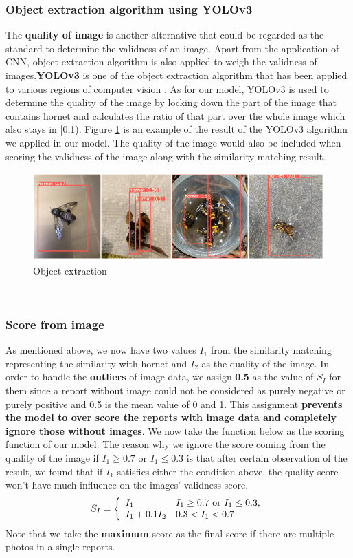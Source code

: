 \documentclass{mcmthesis}
\begin{document}
		\subsubsection{Object extraction algorithm using YOLOv3}
		\quad The \textbf{quality of image} is another alternative that could be regarded as the standard to determine the validness of an image. Apart from the application of CNN, object extraction algorithm is also applied to weigh the validness of images.\textbf{YOLOv3} is one of the object extraction algorithm that has been applied to various regions of computer vision  \cite{Yolo}. As for our model, YOLOv3 is used to determine the quality of the image by locking down the part of the image that contains hornet and calculates the ratio of that part over the whole image which also stays in [0,1). Figure \ref{yolo} is an example of the result of the YOLOv3 algorithm we applied in our model. The quality of the image would also be included when scoring the validness of the image along with the similarity matching result.
			\begin{figure}[h]
			\centering
			\includegraphics[scale=0.38]{yolo.png}
			\caption{Object extraction}
			\label{yolo}
		\end{figure}\\
		\subsubsection{Score from image}
		\quad As mentioned above, we now have two values $I_1$ from the similarity matching representing the similarity with hornet and $I_2$ as the quality of the image. In order to handle the \textbf{outliers} of image data, we assign \textbf{0.5} as the value of $S_I$ for them since a report without image could not be considered as purely negative or purely positive and 0.5 is the mean value of 0 and 1. This assignment \textbf{prevents the model to over score the reports with image data and completely ignore those without images}. We now take the function below as the scoring function of our model. The reason why we ignore the score coming from the quality of the image if $I_1\geq0.7$ or  $I_1\leq0.3$ is that after certain observation of the result, we found that if $I_1$ satisfies either the condition above, the quality score won't have much influence on the images' validness score.
	   \[S_{I}=\left\{\begin{array}{ll}
		I_1&I_1\geq0.7 \text{\space or\space} I_1\leq0.3,\\
		I_1 + 0.1I_2&
		0.3< I_1 < 0.7
	   \end{array}\right.\]
   	Note that we take the \textbf{maximum} score as the final score if there are multiple photos in a single reports.
\end{document}
